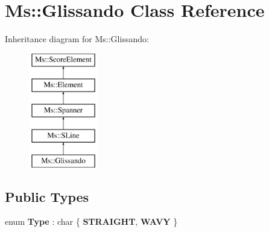 \hypertarget{class_ms_1_1_glissando}{}\section{Ms\+:\+:Glissando Class Reference}
\label{class_ms_1_1_glissando}
Inheritance diagram for Ms\+:\+:Glissando\+:\begin{figure}[H]
\begin{center}
\leavevmode
\includegraphics[height=5.000000cm]{class_ms_1_1_glissando}
\end{center}
\end{figure}
\subsection*{Public Types}
\begin{DoxyCompactItemize}
\item 
\mbox{\label{class_ms_1_1_glissando_aca825b6bc3d5d85f5cc789f93a0d65d5}} 
enum {\bfseries Type} \+: char \{ {\bfseries S\+T\+R\+A\+I\+G\+HT}, 
{\bfseries W\+A\+VY}
 \}
\end{DoxyCompactItemize}
